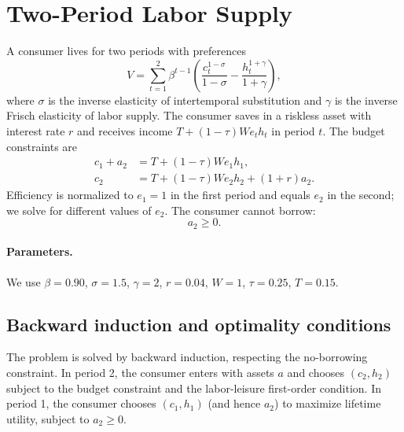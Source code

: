 \section{Two-Period Labor Supply}


A consumer lives for two periods with preferences
\begin{equation}
  V = \sum_{t=1}^2 \beta^{t-1} \left( \frac{c_t^{1-\sigma}}{1-\sigma} - \frac{h_t^{1+\gamma}}{1+\gamma} \right),
\end{equation}
where $\sigma$ is the inverse elasticity of intertemporal substitution and $\gamma$ is the inverse Frisch elasticity of labor supply. The consumer saves in a riskless asset with interest rate $r$ and receives income $T + (1-\tau) W e_t h_t$ in period $t$. The budget constraints are
\begin{align}
  c_1 + a_2 &= T + (1-\tau) W e_1 h_1, \\
  c_2 &= T + (1-\tau) W e_2 h_2 + (1+r) a_2.
\end{align}
Efficiency is normalized to $e_1 = 1$ in the first period and equals $e_2$ in the second; we solve for different values of $e_2$. The consumer cannot borrow:
\begin{equation}
  a_2 \ge 0.
\end{equation}

\paragraph{Parameters.}
We use $\beta = 0.90$, $\sigma = 1.5$, $\gamma = 2$, $r = 0.04$, $W = 1$, $\tau = 0.25$, $T = 0.15$.

\subsection{Backward induction and optimality conditions}

The problem is solved by backward induction, respecting the no-borrowing constraint. In period 2, the consumer enters with assets $a$ and chooses $(c_2, h_2)$ subject to the budget constraint and the labor-leisure first-order condition. In period 1, the consumer chooses $(c_1, h_1)$ (and hence $a_2$) to maximize lifetime utility, subject to $a_2 \ge 0$.

